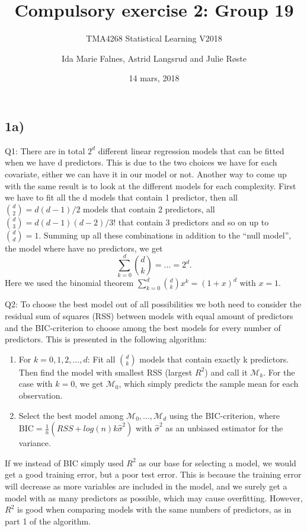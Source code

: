 \documentclass[]{article}
\title{Compulsory exercise 2: Group 19}
\subtitle{TMA4268 Statistical Learning V2018}
\author{Ida Marie Falnes, Astrid Langsrud and Julie Røste}
\date{14 mars, 2018}
\begin{document}
\maketitle

\subsection{1a)}\label{a}

Q1: There are in total \(2^d\) different linear regression models that
can be fitted when we have d predictors. This is due to the two choices
we have for each covariate, either we can have it in our model or not.
Another way to come up with the same result is to look at the different
models for each complexity. First we have to fit all the d models that
contain 1 predictor, then all \(\binom{d}{2}=d(d-1)/2\) models that
contain 2 predictors, all \(\binom{d}{3}=d(d-1)(d-2)/3!\) that contain 3
predictors and so on up to \(\binom{d}{d}=1\). Summing up all these
combinations in addition to the ``null model'', the model where have no
predictors, we get \[\sum_{k=0}^{d} \binom{d}{k} = ... = 2^d.\] Here we
used the binomial theorem \(\sum_{k=0}^{d}\binom{d}{k}x^k=(1+x)^d\) with
\(x=1\).

Q2: To choose the best model out of all possibilities we both need to
consider the residual sum of squares (RSS) between models with equal
amount of predictors and the BIC-criterion to choose among the best
models for every number of predictors. This is presented in the
following algorithm:

\begin{enumerate}
\def\labelenumi{\arabic{enumi}.}
\item
  For \(k=0,1,2,...,d\): \newline
  Fit all \(\binom{d}{k}\) models that contain exactly k predictors.
  Then find the model with smallest RSS (largest \(R^2\)) and call it
  \(\mathcal{M}_k\). For the case with \(k=0\), we get
  \(\mathcal{M}_0\), which simply predicts the sample mean for each
  observation.
\item
  Select the best model among \(\mathcal{M}_0, ...,\mathcal{M}_d\) using
  the BIC-criterion, where
  \(\text{BIC}=\frac{1}{n}(RSS+log(n)k{\hat\sigma}^2)\) with
  \({\hat\sigma}^2\) as an unbiased estimator for the variance.
\end{enumerate}

If we instead of BIC simply used \(R^2\) as our base for selecting a
model, we would get a good training error, but a poor test error. This
is because the training error will decrease as more variables are
included in the model, and we surely get a model with as many predictors
as possible, which may cause overfitting. However, \(R^2\) is good when
comparing models with the same numbers of predictors, as in part 1 of
the algorithm.
\end{document}
